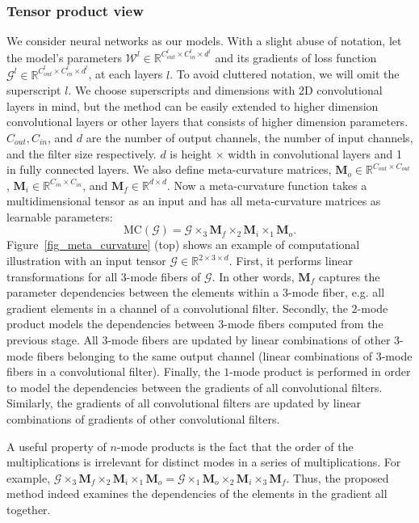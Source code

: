 \documentclass{article}
\begin{document}
\subsubsection{Tensor product view}
We consider neural networks as our models. With a slight abuse of notation, let the model's parameters $\mathcal{W}^l \in \mathbb{R}^{C_{out}^l \times C_{in}^l \times d^l}$ and its gradients of loss function $\mathcal{G}^l \in \mathbb{R}^{C_{out}^l \times C_{in}^l \times d^l}$, at each layers $l$. To avoid cluttered notation, we will omit the superscript $l$. We choose superscripts and dimensions with 2D convolutional layers in mind, but the method can be easily extended to higher dimension convolutional layers or other layers that consists of higher dimension parameters. $C_{out}, C_{in}$, and $d$ are the number of output channels, the number of input channels, and the filter size  respectively. $d$ is height $\times$ width in convolutional layers and 1 in fully connected layers. We also define meta-curvature matrices, $\mathbf{M}_o \in \mathbb{R}^{C_{out} \times C_{out}}$, $\mathbf{M}_{i} \in \mathbb{R}^{C_{in} \times C_{in}}$, and $\mathbf{M}_f \in \mathbb{R}^{d \times d}$. Now a meta-curvature function takes a multidimensional tensor as an input and has all meta-curvature matrices as learnable parameters:
\begin{equation}
\label{eq:mc_tensor}
\textrm{MC}(\mathcal{G}) = \mathcal{G} \times_3 \mathbf{M}_f \times_2 \mathbf{M}_{i} \times_1 \mathbf{M}_{o} .
\end{equation}
Figure~\ref{fig_meta_curvature} (top) shows an example of computational illustration with an input tensor $\mathcal{G} \in \mathbb{R}^{2 \times 3 \times d}$. First, it performs linear transformations for all $3$-mode fibers of $\mathcal{G}$. In other words, $\mathbf{M}_f$ captures the parameter dependencies between the elements within a $3$-mode fiber, e.g. all gradient elements in a channel of a convolutional filter. Secondly, the $2$-mode product models the dependencies between 3-mode fibers computed from the previous stage. All $3$-mode fibers are updated by linear combinations of other $3$-mode fibers belonging to the same output channel (linear combinations of $3$-mode fibers in a convolutional filter). Finally, the $1$-mode product is performed in order to model the dependencies between the gradients of all convolutional filters. Similarly, the gradients of all convolutional filters are updated by linear combinations of gradients of other convolutional filters. 

A useful property of $n$-mode products is the fact that the order of the multiplications is irrelevant for distinct modes in a series of multiplications. For example, $\mathcal{G} \times_3 \mathbf{M}_f \times_2 \mathbf{M}_{i} \times_1 \mathbf{M}_{o} = \mathcal{G} \times_1 \mathbf{M}_o \times_2 \mathbf{M}_{i} \times_3 \mathbf{M}_{f}$. Thus, the proposed method indeed examines the dependencies of the elements in the gradient all together. 
\end{document}
